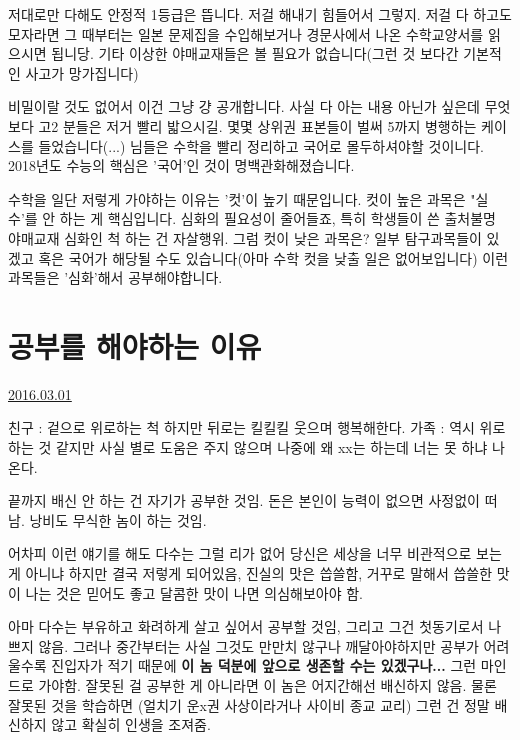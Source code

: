 저대로만 다해도 안정적 1등급은 뜹니다. 저걸 해내기 힘들어서 그렇지.
저걸 다 하고도 모자라면 그 때부터는 일본 문제집을 수입해보거나 경문사에서 나온 수학교양서를 읽으시면 됩니당.
기타 이상한 야매교재들은 볼 필요가 없습니다(그런 것 보다간 기본적인 사고가 망가집니다)
\vspace{5mm}

비밀이랄 것도 없어서 이건 그냥 걍 공개합니다. 사실 다 아는 내용 아닌가 싶은데
무엇보다 고2 분들은 저거 빨리 밟으시길. 몇몇 상위권 표본들이 벌써 5까지 병행하는 케이스를 들었습니다(...)
님들은 수학을 빨리 정리하고 국어로 몰두하셔야할 것이니다. 2018년도 수능의 핵심은 '국어'인 것이 명백관화해졌습니다.
\vspace{5mm}

수학을 일단 저렇게 가야하는 이유는 '컷'이 높기 때문입니다.
컷이 높은 과목은 "실수'를 안 하는 게 핵심입니다. 심화의 필요성이 줄어들죠, 특히 학생들이 쓴 출처불명 야매교재 심화인 척 하는 건 자살행위.
그럼 컷이 낮은 과목은? 일부 탐구과목들이 있겠고 혹은 국어가 해당될 수도 있습니다(아마 수학 컷을 낮출 일은 없어보입니다)
이런 과목들은 '심화'해서 공부해야합니다.
\vspace{5mm}









\section{공부를 해야하는 이유}
\href{https://www.kockoc.com/Apoc/658157}{2016.03.01}

\vspace{5mm}

친구 : 겉으로 위로하는 척 하지만 뒤로는 킬킬킬 웃으며 행복해한다.
가족 : 역시 위로하는 것 같지만 사실 별로 도움은 주지 않으며 나중에 왜 xx는 하는데 너는 못 하냐 나온다.
\vspace{5mm}

끝까지 배신 안 하는 건 자기가 공부한 것임.
돈은 본인이 능력이 없으면 사정없이 떠남.
낭비도 무식한 놈이 하는 것임.
\vspace{5mm}

어차피 이런 얘기를 해도 다수는 그럴 리가 없어
당신은 세상을 너무 비관적으로 보는 게 아니냐 하지만
결국 저렇게 되어있음, 진실의 맛은 씁쓸함,
거꾸로 말해서 씁쓸한 맛이 나는 것은 믿어도 좋고
달콤한 맛이 나면 의심해보아야 함.
\vspace{5mm}

아마 다수는 부유하고 화려하게 살고 싶어서 공부할 것임, 그리고 그건 첫동기로서 나쁘지 않음.
그러나 중간부터는 사실 그것도 만만치 않구나 깨달아야하지만
공부가 어려울수록 진입자가 적기 때문에 \textbf{이 놈 덕분에 앞으로 생존할 수는 있겠구나...} 그런 마인드로 가야함.
잘못된 걸 공부한 게 아니라면 이 놈은 어지간해선 배신하지 않음.
물론 잘못된 것을 학습하면 (얼치기 운x권 사상이라거나 사이비 종교 교리) 그런 건 정말 배신하지 않고 확실히 인생을 조져줌.




